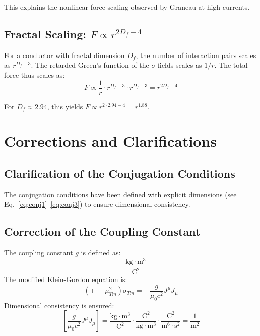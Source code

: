 \documentclass[10pt, a4paper]{article}
\begin{document}
	This explains the nonlinear force scaling observed by Graneau at high currents.
	
	\subsection{Fractal Scaling: $F \propto r^{2D_f - 4}$}
	For a conductor with fractal dimension $D_f$, the number of interaction pairs scales as $r^{D_f - 3}$. The retarded Green’s function of the $\sigma$-fields scales as $1/r$. The total force thus scales as:
	\begin{equation}
		F \propto \frac{1}{r} \cdot r^{D_f - 3} \cdot r^{D_f - 3} = r^{2D_f - 4} \label{eq:fractal_scaling}
	\end{equation}
	
	For $D_f \approx 2.94$, this yields $F \propto r^{2 \cdot 2.94 - 4} = r^{1.88}$.
	
	\section{Corrections and Clarifications}
	\subsection{Clarification of the Conjugation Conditions}
	The conjugation conditions have been defined with explicit dimensions (see Eq.~\ref{eq:conj1}–\ref{eq:conj3}) to ensure dimensional consistency.
	
	\subsection{Correction of the Coupling Constant}
	The coupling constant $g$ is defined as:
	\begin{equation}
		[g] = \frac{\text{kg} \cdot \text{m}^3}{\text{C}^2}
	\end{equation}
	The modified Klein-Gordon equation is:
	\begin{equation}
		(\Box + \mu_{Tm}^2) \sigma_{Tm} = -\frac{g}{\mu_0 c^2} J^\mu J_\mu \label{eq:sigma_eq_final}
	\end{equation}
	Dimensional consistency is ensured:
	\begin{equation}
		\left[\frac{g}{\mu_0 c^2} J^\mu J_\mu\right] = \frac{\text{kg} \cdot \text{m}^3}{\text{C}^2} \cdot \frac{\text{C}^2}{\text{kg} \cdot \text{m}^3} \cdot \frac{\text{C}^2}{\text{m}^6 \cdot \text{s}^2} = \frac{1}{\text{m}^2}
	\end{equation}
	
\end{document}
